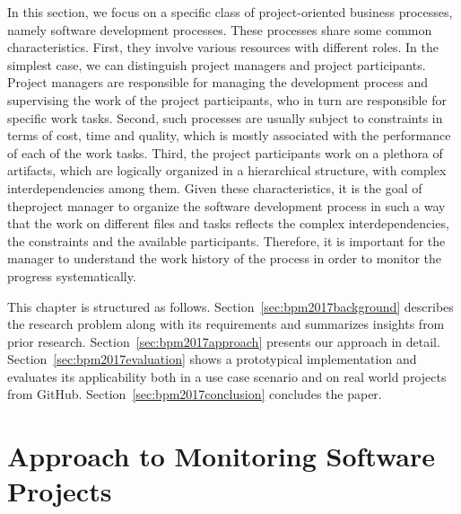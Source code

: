 
In this section, we focus on a specific class of project-oriented business processes,
namely software development processes. These processes share some common
characteristics. First, they involve various resources with different roles. In the
simplest case, we can distinguish project managers and project participants.
Project managers are responsible for managing the development process and
supervising the work of the project participants, who in turn are responsible for
specific work tasks. Second, such processes are usually subject to constraints in
terms of cost, time and quality, which is mostly associated with the performance
of each of the work tasks. Third, the project participants work on a plethora of
artifacts, which are logically organized in a hierarchical structure, with complex
interdependencies among them. Given these characteristics, it is the goal of theproject manager to organize the software development process in such a way
that the work on different files and tasks reflects the complex interdependencies,
the constraints and the available participants. Therefore, it is important for the
manager to understand the work history of the process in order to monitor the
progress systematically.

This chapter is structured as follows. Section~\ref{sec:bpm2017background} describes the research problem along with its requirements and summarizes insights from prior research. Section~\ref{sec:bpm2017approach} presents our approach in detail. Section~\ref{sec:bpm2017evaluation} shows a prototypical implementation and evaluates its applicability both in a use case scenario and on real world projects from GitHub. Section~\ref{sec:bpm2017conclusion} concludes the paper.

\section{Approach to Monitoring Software Projects}








